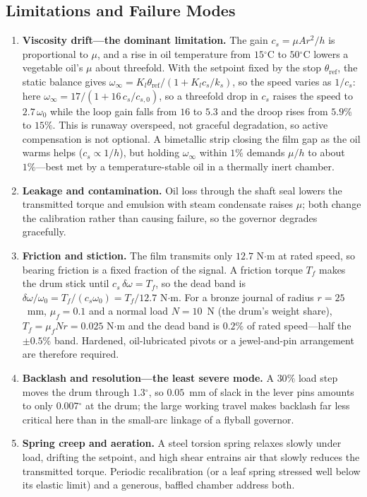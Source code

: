 \documentclass[conference]{IEEEtran}
\newcommand{\dg}{\ensuremath{^{\circ}}}
\begin{document}
\subsection{Limitations and Failure Modes}
\begin{enumerate}
\item \textbf{Viscosity drift---the dominant limitation.} The gain
$c_s=\mu Ar^{2}/h$ is proportional to $\mu$, and a rise in oil temperature from
$15\dg$C to $50\dg$C lowers a vegetable oil's $\mu$ about threefold. With the setpoint
fixed by the stop $\theta_{\mathrm{ref}}$, the static balance gives
$\omega_\infty=K_l\theta_{\mathrm{ref}}/(1+K_lc_s/k_s)$, so the speed varies as
$1/c_s$: here $\omega_\infty=17/(1+16\,c_s/c_{s,0})$, so a threefold drop in $c_s$
raises the speed to $2.7\,\omega_0$ while the loop gain falls from $16$ to $5.3$ and
the droop rises from $5.9\%$ to $15\%$. This is runaway overspeed,
not graceful degradation, so active compensation is not optional. A bimetallic strip
closing the film gap as the oil warms helps ($c_s\propto1/h$), but holding
$\omega_\infty$ within $1\%$ demands $\mu/h$ to about $1\%$---best met by a
temperature-stable oil in a thermally inert chamber.
\item \textbf{Leakage and contamination.} Oil loss through the shaft seal lowers the
transmitted torque and emulsion with steam condensate raises $\mu$; both change the
calibration rather than causing failure, so the governor degrades gracefully.
\item \textbf{Friction and stiction.} The film transmits only $12.7$ N$\cdot$m at
rated speed, so bearing friction is a fixed fraction of the signal. A friction
torque $T_f$ makes the drum
stick until $c_s\,\delta\omega=T_f$, so the dead band is
$\delta\omega/\omega_0=T_f/(c_s\omega_0)=T_f/12.7$ N$\cdot$m. For a bronze journal of
radius $r=25$~mm, $\mu_f=0.1$ and a normal load $N=10$~N (the drum's weight share),
$T_f=\mu_fNr=0.025$ N$\cdot$m and the dead band is $0.2\%$ of rated speed---half the
$\pm0.5\%$ band. Hardened, oil-lubricated pivots or a jewel-and-pin arrangement are
therefore required.
\item \textbf{Backlash and resolution---the least severe mode.} A $30\%$ load step
moves the drum through $1.3\dg$, so $0.05$~mm of slack in the lever pins amounts to
only $0.007\dg$ at the drum; the large working travel makes backlash far less
critical here than in the small-arc linkage of a flyball governor.
\item \textbf{Spring creep and aeration.} A steel torsion spring relaxes slowly
under load, drifting the setpoint, and high shear entrains air that slowly reduces
the transmitted torque. Periodic recalibration (or a leaf spring stressed well below
its elastic limit) and a generous, baffled chamber address both.
\end{enumerate}
\end{document}
